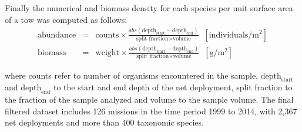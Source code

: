 \documentclass[letterpaper,portrait,11pt]{scrartcl}
\numberwithin{equation}{section}		%
\numberwithin{figure}{section}			%
\numberwithin{table}{section}				%
\begin{document}
\begin{appendices}
Finally the numerical and biomass density for each species per unit surface area of a tow was computed as follows: 
\begin{eqnarray*}
\text{abundance} &=& \text{counts} \times \frac{  abs( \text{depth}_{\text{start}} - \text{depth}_{\text{end}} ) } { \text{split fraction} \times \text{volume} } \; \; [\text{individuals}/ \text{m}^{2} ]  \\
\text{biomass} &=& \text{weight} \times \frac{ abs( \text{depth}_{\text{start}} - \text{depth}_{\text{end}} )} { \text{split fraction} \times \text{volume}} \; \; [\text{g}/\text{m}^2]
\end{eqnarray*}

where counts refer to number of organisms encountered in the sample, $\text{depth}_{\text{start}}$ and $\text{depth}_{\text{end}}$ to the start and end depth of the net deployment, split fraction to the fraction of the sample analyzed and volume to the sample volume. The final filtered dataset includes 126 missions in the time period 1999 to 2014, with 2,367 net deployments and more than 400 taxonomic species. 

\end{appendices}
\end{document}
